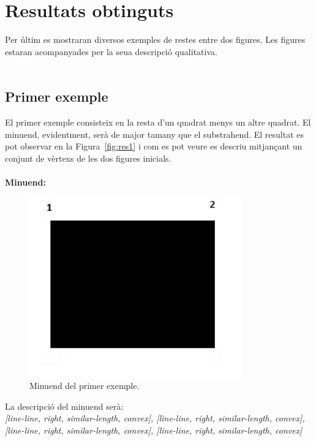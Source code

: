 \documentclass{article}
\begin{document}
\section{Resultats obtinguts}
Per últim es mostraran diversos exemples de restes entre dos figures.
Les figures estaran acompanyades per la seua descripció qualitativa.
\\
\\

\subsection{Primer exemple}
El primer exemple consisteix en la resta d'un quadrat menys un altre quadrat.
El minuend, evidentment, serà de major tamany que el substrahend.
El resultat es pot observar en la Figura~\ref{fig:res1} i com es pot veure es descriu mitjançant un conjunt de vèrtexs de les dos figures inicials.
\\
\\

{\bf Minuend:}
\begin{figure}[!h]
\centering
\includegraphics[width=260pt]{images/quad_gran.jpg}
\caption {Minuend del primer exemple.}
\label {fig:quad_gran1}
\end{figure}

La descripció del minuend serà:
\\
\emph {[line-line, right, similar-length, convex], [line-line, right, similar-length, convex], [line-line, right, similar-length, convex], [line-line, right, similar-length, convex]}
\\
\\
\end{document}
